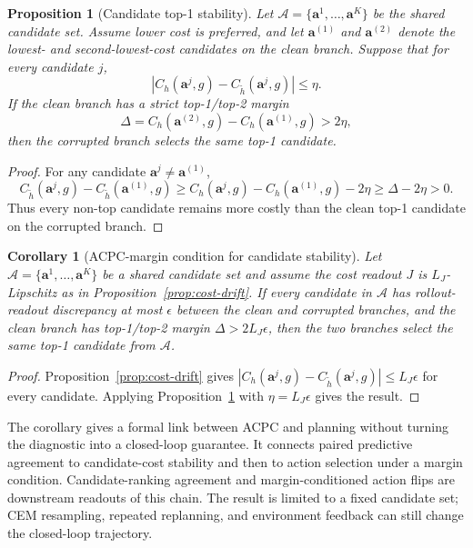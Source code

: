 \documentclass[10pt]{article}
\newtheorem{proposition}{Proposition}
\newtheorem{corollary}{Corollary}
\begin{document}
\begin{proposition}[Candidate top-1 stability]\label{prop:top1-stability}
Let $\mathcal A=\{\mathbf a^1,\ldots,\mathbf a^K\}$ be the shared candidate set. Assume lower cost is preferred, and let $\mathbf a^{(1)}$ and $\mathbf a^{(2)}$ denote the lowest- and second-lowest-cost candidates on the clean branch. Suppose that for every candidate $j$,
\[
 |C_h(\mathbf a^j,g)-C_{\tilde h}(\mathbf a^j,g)|\le \eta .
\]
If the clean branch has a strict top-1/top-2 margin
\[
\Delta = C_h(\mathbf a^{(2)},g)-C_h(\mathbf a^{(1)},g) > 2\eta,
\]
then the corrupted branch selects the same top-1 candidate.
\end{proposition}

\begin{proof}
For any candidate $\mathbf a^j \neq \mathbf a^{(1)}$,
\[
C_{\tilde h}(\mathbf a^j,g)-C_{\tilde h}(\mathbf a^{(1)},g)
\ge
C_h(\mathbf a^j,g)-C_h(\mathbf a^{(1)},g)-2\eta
\ge \Delta-2\eta >0 .
\]
Thus every non-top candidate remains more costly than the clean top-1 candidate on the corrupted branch.
\end{proof}

\begin{corollary}[ACPC-margin condition for candidate stability]\label{cor:acpc-margin}
Let $\mathcal A=\{\mathbf a^1,\ldots,\mathbf a^K\}$ be a shared candidate set and assume the cost readout $J$ is $L_J$-Lipschitz as in Proposition~\ref{prop:cost-drift}. If every candidate in $\mathcal A$ has rollout-readout discrepancy at most $\epsilon$ between the clean and corrupted branches, and the clean branch has top-1/top-2 margin $\Delta > 2L_J\epsilon$, then the two branches select the same top-1 candidate from $\mathcal A$.
\end{corollary}

\begin{proof}
Proposition~\ref{prop:cost-drift} gives $|C_h(\mathbf a^j,g)-C_{\tilde h}(\mathbf a^j,g)|\le L_J\epsilon$ for every candidate. Applying Proposition~\ref{prop:top1-stability} with $\eta=L_J\epsilon$ gives the result.
\end{proof}

The corollary gives a formal link between ACPC and planning without turning the diagnostic into a closed-loop guarantee. It connects paired predictive agreement to candidate-cost stability and then to action selection under a margin condition. Candidate-ranking agreement and margin-conditioned action flips are downstream readouts of this chain. The result is limited to a fixed candidate set; CEM resampling, repeated replanning, and environment feedback can still change the closed-loop trajectory.
\end{document}
